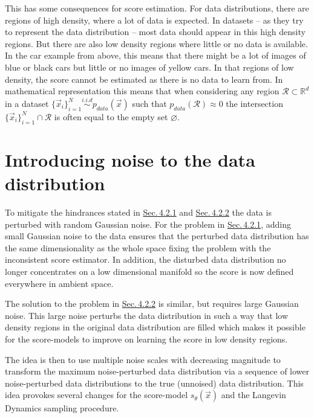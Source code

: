 This has some consequences for score estimation. For data distributions, there are regions of high density, where a lot of data is expected. In datasets – as they try to represent the data distribution – most data should appear in this high density regions. But there are also low density regions where little or no data is available. In the car example from above, this means that there might be a lot of images of blue or black cars but little or no images of yellow cars. In that regions of low density, the score cannot be estimated as there is no data to learn from. In mathematical representation this means that when considering any region $\mathcal{R}\subset\mathbb{R}^d$ in a dataset $\{\vec{x}_i\}_{i=1}^N\overset{i.i.d}{\sim}p_{data}(\vec{x})$ such that $p_{data}(\mathcal{R})\approx0$ the intersection $\{\vec{x}_i\}_{i=1}^N\cap\mathcal{R}$ is often equal to the empty set $\varnothing$. 

\section[Introducing noise to the data distribution]{Introducing noise to the data distribution%
    } \label{sec:4.3}
To mitigate the hindrances stated in \hyperref[sec:4.2.1]{Sec.\,4.2.1} and \hyperref[sec:4.2.2]{Sec.\,4.2.2} the data is perturbed with random Gaussian noise. For the problem in \hyperref[sec:4.2.1]{Sec.\,4.2.1}, adding small Gaussian noise to the data ensures that the perturbed data distribution has the same dimensionality as the whole space fixing the problem with the inconsistent score estimator. In addition, the disturbed data distribution no longer concentrates on a low dimensional manifold so the score is now defined everywhere in ambient space.

The solution to the problem in \hyperref[sec:4.2.2]{Sec.\,4.2.2} is similar, but requires large Gaussian noise. This large noise perturbs the data distribution in such a way that low density regions in the original data distribution are filled which makes it possible for the score-models to improve on learning the score in low density regions.

The idea is then to use multiple noise scales with decreasing magnitude to transform the maximum noise-perturbed data distribution via a sequence of lower noise-perturbed data distributions to the true (unnoised) data distribution. This idea provokes several changes for the score-model $s_\theta(\vec{x})$ and the Langevin Dynamics sampling procedure. 
%
